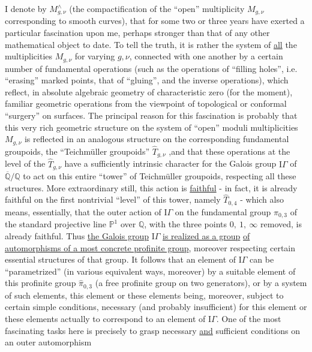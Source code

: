 
I denote by $M^{\wedge}_{g,\nu}$ (the compactification of the ``open'' multiplicity
$M_{g,\nu}$ corresponding to smooth curves), that for some two
or three years have exerted a particular fascination upon me,
perhaps stronger than that of any other mathematical object to date.
To tell the truth, it is rather the system of \uline{all} the multiplicities
$M_{g,\nu}$ for varying $g,\nu$, connected with one another by a certain number
of fundamental operations (such as the operations of ``filling
holes'', i.e. ``erasing'' marked points, that of ``gluing'',
and the inverse operations), which reflect, in absolute algebraic
geometry of characteristic zero (for the moment), familiar geometric
operations from the viewpoint of topological or conformal ``surgery''
on surfaces. The principal reason for this fascination is probably
that this very rich geometric structure on the
system of ``open'' moduli multiplicities $M_{g,\nu}$ is reflected
in an analogous structure on the corresponding fundamental
groupoids, the ``Teichmüller groupoids'' $\hat{T}_{g,\nu}$ ,and that these operations
at the level of the $\hat{T}_{g,\nu}$ have a sufficiently intrinsic character
for the Galois group $\mathrm{I}\!\Gamma$ of $\overline{\mathbb{Q}}/\mathbb{Q}$ to act on this entire ``tower'' of
Teichmüller groupoids, respecting all these structures. More
extraordinary still, this action is \uline{faithful} - in fact,
it is already faithful on the first nontrivial ``level'' of this tower,
namely $\hat{T}_{0,4}$ - which also means, essentially, that the outer
action of $\mathrm{I}\!\Gamma$ on the fundamental group $\hat{\pi}_{0,3}$ of the standard
projective line $\mathbb{P}^1$ over $\mathbb{Q}$, with the three points $0,\ 1,\ \infty$ removed, is
already faithful. Thus \uline{the Galois group} $\mathrm{I}\!\Gamma$ \uline{is realized as a group}
\uline{of automorphisms of a most concrete profinite group}, moreover respecting
certain essential structures of that group. It follows
that an element of $\mathrm{I}\!\Gamma$ can be ``parametrized'' (in various equivalent
ways, moreover) by a suitable element of this profinite group
$\hat{\pi}_{0,3}$ (a free profinite group on two generators), or by a system
of such elements, this element or these elements being, moreover, subject
to certain simple conditions, necessary (and probably insufficient)
for this element or these elements actually to correspond to an element of $\mathrm{I}\!\Gamma$.
One of the most fascinating tasks here is precisely to grasp
necessary \uline{and} sufficient conditions on an outer automorphism


